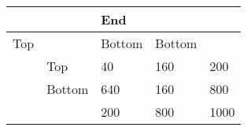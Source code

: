 \documentclass[preview]{standalone}
\begin{document}
\begin{center}
\begin{table}[]
        \centering
        \begin{tabular}{|l|l|l|l|l|}\hline
        &  & \multicolumn{2}{l}{End} &  \\\hline
        Top &  & Bottom & Bottom &  \\
        & Top & 40 & 160 & 200 \\
        & Bottom & 640 & 160 & 800 \\
        &  & 200 & 800 & 1000 \\\hline
        \end{tabular}
        \end{table}
\end{center}
\end{document}
